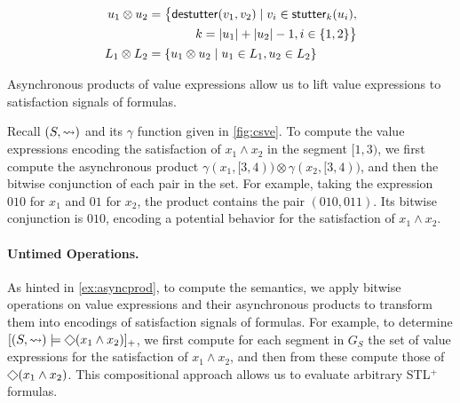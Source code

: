 \begin{align*}
	u_1 \otimes u_2 &=
	\begin{aligned}[t]
	\big\{ \destutter(v_1, v_2) \st v_i \in \stutter_k(u_i), \\
		k = |u_1| + |u_2| - 1, i \in \{1,2\} \big\}
	\end{aligned}\\
	L_1 \otimes L_2 &= \{ u_1 \otimes u_2 \st u_1 \in L_1, u_2 \in L_2 \}
\end{align*}

Asynchronous products of value expressions allow us to lift value expressions to satisfaction signals of formulas.

\begin{example} \label{ex:asyncprod}
	Recall $(S, {\rightsquigarrow})$ and its $\gamma$ function given in \cref{fig:csve}.
	To compute the value expressions encoding the satisfaction of $x_1 \land x_2$ in the segment $[1,3)$, we first compute the asynchronous product $\gamma(x_1, [3,4)) \otimes \gamma(x_2, [3,4))$, and then the bitwise conjunction of each pair in the set.
	For example, taking the expression $0  1  0$ for $x_1$ and $0  1$ for $x_2$, the product contains the pair $(010, 011)$.
	Its bitwise conjunction is $0  1  0$, encoding a potential behavior for the satisfaction of $x_1 \land x_2$.
\end{example}

\paragraph*{Untimed Operations.}
As hinted in \cref{ex:asyncprod}, to compute the semantics, we apply bitwise operations on value expressions and their asynchronous products to transform them into encodings of satisfaction signals of formulas.
For example, to determine $[(S, {\hb}) \models \LTLeventually (x_1 \land x_2)]_+$, we first compute for each segment in $G_S$ the set of value expressions for the satisfaction of $x_1 \land x_2$, and then from these compute those of $\LTLeventually (x_1 \land x_2)$.
This compositional approach allows us to evaluate arbitrary STL$^+$ formulas.

